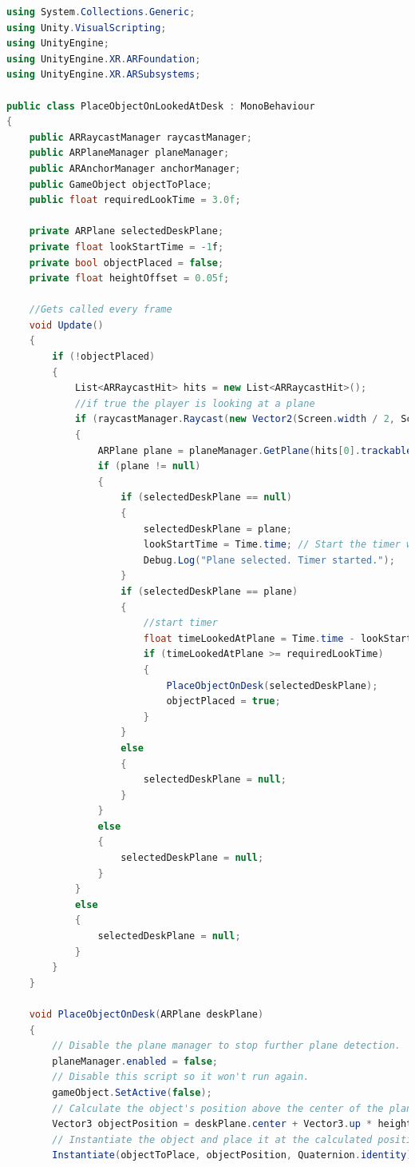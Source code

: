 \begin{lstlisting}[language=C#, style=csharpstyle, caption=3D Objekt in der echten Welt platzieren]
using System.Collections.Generic;
using Unity.VisualScripting;
using UnityEngine;
using UnityEngine.XR.ARFoundation;
using UnityEngine.XR.ARSubsystems;

public class PlaceObjectOnLookedAtDesk : MonoBehaviour
{
    public ARRaycastManager raycastManager;
    public ARPlaneManager planeManager;
    public ARAnchorManager anchorManager;
    public GameObject objectToPlace;
    public float requiredLookTime = 3.0f;

    private ARPlane selectedDeskPlane;
    private float lookStartTime = -1f;
    private bool objectPlaced = false;
    private float heightOffset = 0.05f;

    //Gets called every frame
    void Update()
    {
        if (!objectPlaced)
        {
            List<ARRaycastHit> hits = new List<ARRaycastHit>();
            //if true the player is looking at a plane
            if (raycastManager.Raycast(new Vector2(Screen.width / 2, Screen.height / 2), hits, TrackableType.Planes))
            {
                ARPlane plane = planeManager.GetPlane(hits[0].trackableId);
                if (plane != null)
                {
                    if (selectedDeskPlane == null)
                    {
                        selectedDeskPlane = plane;
                        lookStartTime = Time.time; // Start the timer when a new plane is selected.
                        Debug.Log("Plane selected. Timer started.");
                    }
                    if (selectedDeskPlane == plane)
                    {
                        //start timer
                        float timeLookedAtPlane = Time.time - lookStartTime;
                        if (timeLookedAtPlane >= requiredLookTime)
                        {
                            PlaceObjectOnDesk(selectedDeskPlane);
                            objectPlaced = true;
                        }
                    }
                    else
                    {
                        selectedDeskPlane = null;
                    }
                }
                else
                {
                    selectedDeskPlane = null;
                }
            }
            else
            {
                selectedDeskPlane = null;
            }
        }
    }

    void PlaceObjectOnDesk(ARPlane deskPlane)
    {
        // Disable the plane manager to stop further plane detection.
        planeManager.enabled = false;
        // Disable this script so it won't run again.
        gameObject.SetActive(false);
        // Calculate the object's position above the center of the plane.
        Vector3 objectPosition = deskPlane.center + Vector3.up * heightOffset;
        // Instantiate the object and place it at the calculated position.
        Instantiate(objectToPlace, objectPosition, Quaternion.identity);



\end{lstlisting}
